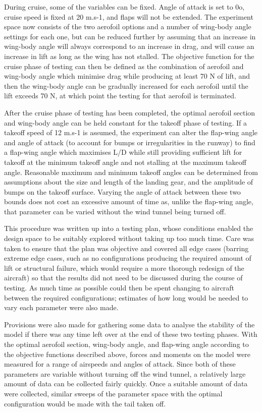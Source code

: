 \documentclass[../../main.tex]{subfiles}
\begin{document}
During cruise, some of the variables can be fixed.
Angle of attack is set to 0o, cruise speed is fixed at 20 m.s-1, and flaps will not be extended.
The experiment space now consists of the two aerofoil options and a number of wing-body angle settings for each one, but can be reduced further by assuming that an increase in wing-body angle will always correspond to an increase in drag, and will cause an increase in lift as long as the wing has not stalled.
The objective function for the cruise phase of testing can then be defined as the combination of aerofoil and wing-body angle which minimise drag while producing at least 70 N of lift, and then the wing-body angle can be gradually increased for each aerofoil until the lift exceeds 70 N, at which point the testing for that aerofoil is terminated. 

After the cruise phase of testing has been completed, the optimal aerofoil section and wing-body angle can be held constant for the takeoff phase of testing.
If a takeoff speed of 12 m.s-1 is assumed, the experiment can alter the flap-wing angle and angle of attack (to account for bumps or irregularities in the runway) to find a flap-wing angle which maximises L/D while still providing sufficient lift for takeoff at the minimum takeoff angle and not stalling at the maximum takeoff angle.
Reasonable maximum and minimum takeoff angles can be determined from assumptions about the size and length of the landing gear, and the amplitude of bumps on the takeoff surface.
Varying the angle of attack between these two bounds does not cost an excessive amount of time as, unlike the flap-wing angle, that parameter can be varied without the wind tunnel being turned off. 

This procedure was written up into a testing plan, whose conditions enabled the design space to be suitably explored without taking up too much time.
Care was taken to ensure that the plan was objective and covered all edge cases (barring extreme edge cases, such as no configurations producing the required amount of lift or structural failure, which would require a more thorough redesign of the aircraft) so that the results did not need to be discussed during the course of testing.
As much time as possible could then be spent changing to aircraft between the required configurations; estimates of how long would be needed to vary each parameter were also made.

Provisions were also made for gathering some data to analyse the stability of the model if there was any time left over at the end of these two testing phases.
With the optimal aerofoil section, wing-body angle, and flap-wing angle according to the objective functions described above, forces and moments on the model were measured for a range of airspeeds and angles of attack.
Since both of these parameters are variable without turning off the wind tunnel, a relatively large amount of data can be collected fairly quickly.
Once a suitable amount of data were collected, similar sweeps of the parameter space with the optimal configuration would be made with the tail taken off. 
\end{document}
